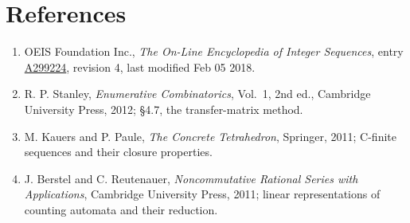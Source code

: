 \documentclass[11pt]{article}
\theoremstyle{definition}
\begin{document}
\section{References}

\begin{enumerate}

\item OEIS Foundation Inc., \emph{The On-Line Encyclopedia of Integer Sequences}, entry \href{https://oeis.org/A299224}{A299224}, revision 4, last modified Feb 05 2018.

\item R. P. Stanley, \emph{Enumerative Combinatorics}, Vol.~1, 2nd ed., Cambridge University Press, 2012; \S4.7, the transfer-matrix method.

\item M. Kauers and P. Paule, \emph{The Concrete Tetrahedron}, Springer, 2011; C-finite sequences and their closure properties.

\item J. Berstel and C. Reutenauer, \emph{Noncommutative Rational Series with Applications}, Cambridge University Press, 2011; linear representations of counting automata and their reduction.

\end{enumerate}
\end{document}
